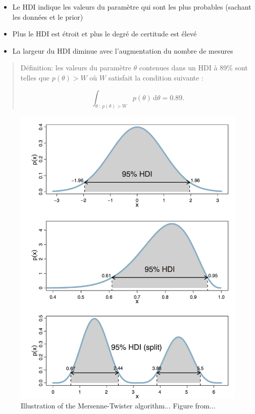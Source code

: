 \documentclass[
  a4paper,11pt,twoside,onecolumn,openright,final,oldfontcommands]{memoir}
\providecommand{\tightlist}{%
  \setlength{\itemsep}{0pt}\setlength{\parskip}{0pt}}
\theoremstyle{definition}
\theoremstyle{definition}
\theoremstyle{definition}
\theoremstyle{definition}
\theoremstyle{remark}
\begin{document}
\begin{itemize}
\tightlist
\item
  Le HDI indique les valeurs du paramètre qui sont les plus probables (sachant les données et le prior)
\item
  Plus le HDI est étroit et plus le degré de certitude est élevé
\item
  La largeur du HDI diminue avec l'augmentation du nombre de mesures
\end{itemize}

\begin{quote}
Définition: les valeurs du paramètre \(\theta\) contenues dans un HDI à 89\% sont telles que \(p(\theta) > W\) où \(W\) satisfait la condition suivante :

\[\int_{\theta \ : \ p(\theta) > W} p(\theta) \, \mathrm{d} \theta = 0.89.\]
\end{quote}

\begin{figure}[!htb]

{\centering \includegraphics[width=1\linewidth]{figures/HDI} 

}

\caption{Illustration of the Mersenne-Twister algorithm... Figure from...}\label{fig:hdi}
\end{figure}
\end{document}
